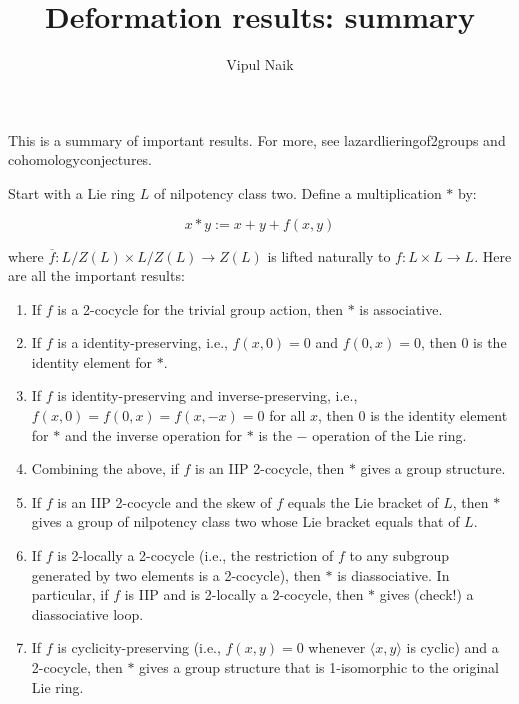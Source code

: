 \documentclass[10pt]{amsart}
\title{Deformation results: summary}
\author{Vipul Naik}
\begin{document}
\maketitle

This is a summary of important results. For more, see
lazardlieringof2groups and cohomologyconjectures.

Start with a Lie ring $L$ of nilpotency class two. Define a
multiplication $*$ by:

\begin{equation}
  x * y := x + y + f(x,y)
\end{equation}

where $\overline{f}:L/Z(L) \times L/Z(L) \to Z(L)$ is lifted naturally
to $f:L \times L \to L$. Here are all the important results:

\begin{enumerate}
\item If $f$ is a 2-cocycle for the trivial group action, then $*$ is associative.
\item If $f$ is a identity-preserving, i.e., $f(x,0) = 0$ and $f(0,x)
  = 0$, then $0$ is the identity element for $*$.
\item If $f$ is identity-preserving and inverse-preserving, i.e.,
  $f(x,0) = f(0,x) = f(x,-x) = 0$ for all $x$, then $0$ is the
  identity element for $*$ and the inverse operation for $*$ is the
  $-$ operation of the Lie ring.
\item Combining the above, if $f$ is an IIP 2-cocycle, then $*$ gives
  a group structure.
\item If $f$ is an IIP 2-cocycle and the skew of $f$ equals the Lie
  bracket of $L$, then $*$ gives a group of nilpotency class two whose
  Lie bracket equals that of $L$.
\item If $f$ is 2-locally a 2-cocycle (i.e., the restriction of $f$ to
  any subgroup generated by two elements is a 2-cocycle), then $*$ is
  diassociative. In particular, if $f$ is IIP and is 2-locally a
  2-cocycle, then $*$ gives (check!) a diassociative loop.
\item If $f$ is cyclicity-preserving (i.e., $f(x,y) = 0$ whenever
  $\langle x,y \rangle$ is cyclic) and a 2-cocycle, then $*$ gives a
  group structure that is 1-isomorphic to the original Lie ring.
\end{enumerate}
\end{document}

